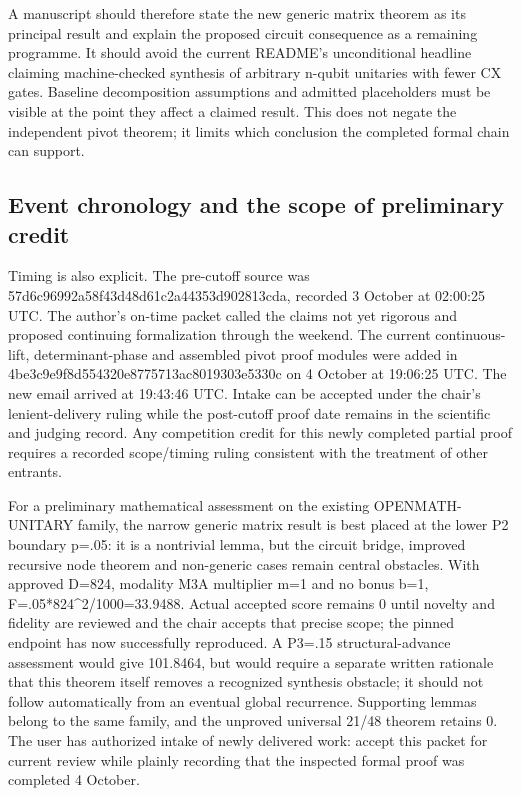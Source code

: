 \documentclass[11pt,a4paper]{article}
\begin{document}
A manuscript should therefore state the new generic matrix theorem as its principal result and explain the proposed circuit consequence as a remaining programme. It should avoid the current README's unconditional headline claiming machine-checked synthesis of arbitrary n-qubit unitaries with fewer CX gates. Baseline decomposition assumptions and admitted placeholders must be visible at the point they affect a claimed result. This does not negate the independent pivot theorem; it limits which conclusion the completed formal chain can support.

\subsection{Event chronology and the scope of preliminary credit}
Timing is also explicit. The pre-cutoff source was 57d6c96992a58f43d48d61c2a44353d902813cda, recorded 3 October at 02:00:25 UTC. The author's on-time packet called the claims not yet rigorous and proposed continuing formalization through the weekend. The current continuous-lift, determinant-phase and assembled pivot proof modules were added in 4be3c9e9f8d554320e8775713ac8019303e5330c on 4 October at 19:06:25 UTC. The new email arrived at 19:43:46 UTC. Intake can be accepted under the chair's lenient-delivery ruling while the post-cutoff proof date remains in the scientific and judging record. Any competition credit for this newly completed partial proof requires a recorded scope/timing ruling consistent with the treatment of other entrants.

For a preliminary mathematical assessment on the existing OPENMATH-UNITARY family, the narrow generic matrix result is best placed at the lower P2 boundary p=.05: it is a nontrivial lemma, but the circuit bridge, improved recursive node theorem and non-generic cases remain central obstacles. With approved D=824, modality M3A multiplier m=1 and no bonus b=1, F=.05*824\textasciicircum{}2/1000=33.9488. Actual accepted score remains 0 until novelty and fidelity are reviewed and the chair accepts that precise scope; the pinned endpoint has now successfully reproduced. A P3=.15 structural-advance assessment would give 101.8464, but would require a separate written rationale that this theorem itself removes a recognized synthesis obstacle; it should not follow automatically from an eventual global recurrence. Supporting lemmas belong to the same family, and the unproved universal 21/48 theorem retains 0. The user has authorized intake of newly delivered work: accept this packet for current review while plainly recording that the inspected formal proof was completed 4 October.
\end{document}
